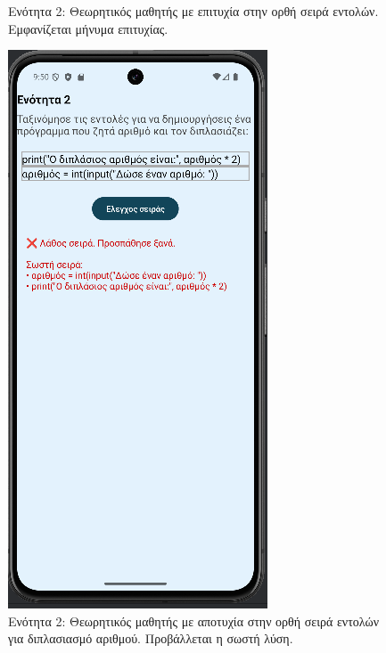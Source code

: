 \documentclass[11pt]{report}
\begin{document}
\begin{figure}[H]
\begin{minipage}[b]{0.45\textwidth}
    \caption{Ενότητα 2: Θεωρητικός μαθητής με επιτυχία στην ορθή σειρά εντολών. Εμφανίζεται μήνυμα επιτυχίας.}
  \end{minipage}
  \hfill
  \begin{minipage}[b]{0.45\textwidth}
    \includegraphics[width=\linewidth, height=0.35\textheight, keepaspectratio]{Figures/εικόνα (17).png}
    \caption{Ενότητα 2: Θεωρητικός μαθητής με αποτυχία στην ορθή σειρά εντολών για διπλασιασμό αριθμού. Προβάλλεται η σωστή λύση.}
  \end{minipage}
\end{figure}
\end{document}
